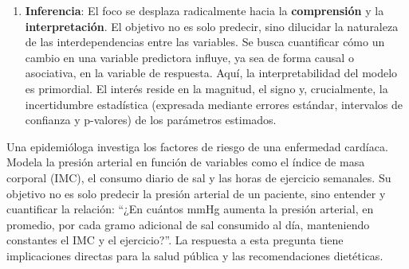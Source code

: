\documentclass[
  letterpaper,
  DIV=11,
  numbers=noendperiod]{scrreprt}
\providecommand{\tightlist}{%
  \setlength{\itemsep}{0pt}\setlength{\parskip}{0pt}}
\begin{document}
\begin{enumerate}
\def\labelenumi{\arabic{enumi}.}
\setcounter{enumi}{1}
\tightlist
\item
  \textbf{Inferencia}: El foco se desplaza radicalmente hacia la
  \textbf{comprensión} y la \textbf{interpretación}. El objetivo no es
  solo predecir, sino dilucidar la naturaleza de las interdependencias
  entre las variables. Se busca cuantificar cómo un cambio en una
  variable predictora influye, ya sea de forma causal o asociativa, en
  la variable de respuesta. Aquí, la interpretabilidad del modelo es
  primordial. El interés reside en la magnitud, el signo y,
  crucialmente, la incertidumbre estadística (expresada mediante errores
  estándar, intervalos de confianza y p-valores) de los parámetros
  estimados.
\end{enumerate}

\begin{tcolorbox}[enhanced jigsaw, leftrule=.75mm, breakable, colbacktitle=quarto-callout-tip-color!10!white, bottomrule=.15mm, colframe=quarto-callout-tip-color-frame, toprule=.15mm, colback=white, coltitle=black, bottomtitle=1mm, left=2mm, title=\textcolor{quarto-callout-tip-color}{\faLightbulb}\hspace{0.5em}{Ejemplo}, opacityback=0, arc=.35mm, opacitybacktitle=0.6, toptitle=1mm, titlerule=0mm, rightrule=.15mm]

Una epidemióloga investiga los factores de riesgo de una enfermedad
cardíaca. Modela la presión arterial en función de variables como el
índice de masa corporal (IMC), el consumo diario de sal y las horas de
ejercicio semanales. Su objetivo no es solo predecir la presión arterial
de un paciente, sino entender y cuantificar la relación: ``¿En cuántos
mmHg aumenta la presión arterial, en promedio, por cada gramo adicional
de sal consumido al día, manteniendo constantes el IMC y el
ejercicio?''. La respuesta a esta pregunta tiene implicaciones directas
para la salud pública y las recomendaciones dietéticas.

\end{tcolorbox}
\end{document}

